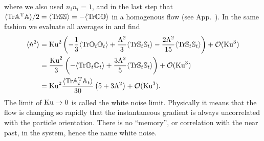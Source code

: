 \documentclass[thesis.tex]{subfiles}
\begin{document}
where we also used $n_in_i=1$, and in the last step that $\langle\mbox{Tr}\mathbb{A}^{\mathrm T} \mathbb{A}\rangle/2=\langle\mbox{Tr}\mathbb{S}\mathbb{S}\rangle=-\langle\mbox{Tr}\mathbb{O}\mathbb{O}\rangle$ in a homogenous flow (see App.~). In the same fashion we evaluate all averages in  and find
\begin{align*}
	\langle \dot n^2\rangle &=\mbox{Ku}^2 \left(-\frac{1}{3}\langle\mbox{Tr}\mathbb{O}_t\mathbb{O}_t\rangle +  \frac{\Lambda^2}{3}\langle\mbox{Tr}\mathbb{S}_t \mathbb{S}_t\rangle - \frac{2\Lambda^2}{15}\langle\mbox{Tr}\mathbb{S}_t\mathbb{S}_t \rangle\right) + \mathcal O(\mbox{Ku}^3)  \\
	&= \frac{\mbox{Ku}^2}{3}\left(-\langle\mbox{Tr}\mathbb{O}_t\mathbb{O}_t\rangle +  \frac{3\Lambda^2}{5}\langle\mbox{Tr}\mathbb{S}_t \mathbb{S}_t\rangle\right) + \mathcal O(\mbox{Ku}^3)  \\
	&= \mbox{Ku}^2\frac{\langle\mbox{Tr}\mathbb{A}_t^{\mathrm T} \mathbb{A}_t\rangle}{30}\left(5 + 3 \Lambda^2\right)+ \mathcal O(\mbox{Ku}^3).  
\end{align*}
The limit of $\mbox{Ku}\to0$ is called the white noise limit. Physically it means that the flow is changing so rapidly that the instantaneous gradient is always uncorrelated with the particle orientation. There is no ``memory'', or correlation with the near past, in the system, hence the name white noise.
\end{document}
